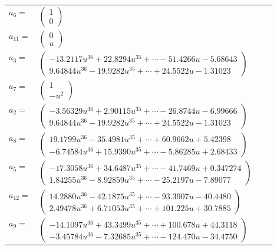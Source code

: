 \documentclass[1p]{elsarticle_modified}
\theoremstyle{definition}
\begin{document}
\begin{tabular}{m{7pt} m{180pt} m{7pt} m{180pt} }
\flushright $a_{6}=$&$\begin{pmatrix}1\\0\end{pmatrix}$ \\
\flushright $a_{11}=$&$\begin{pmatrix}0\\u\end{pmatrix}$ \\
\flushright $a_{3}=$&$\begin{pmatrix}-13.2117 u^{36}+22.8294 u^{35}+\cdots-51.4266 u-5.68643\\9.64844 u^{36}-19.9282 u^{35}+\cdots+24.5522 u-1.31023\end{pmatrix}$ \\
\flushright $a_{7}=$&$\begin{pmatrix}1\\- u^2\end{pmatrix}$ \\
\flushright $a_{2}=$&$\begin{pmatrix}-3.56329 u^{36}+2.90115 u^{35}+\cdots-26.8744 u-6.99666\\9.64844 u^{36}-19.9282 u^{35}+\cdots+24.5522 u-1.31023\end{pmatrix}$ \\
\flushright $a_{8}=$&$\begin{pmatrix}19.1799 u^{36}-35.4981 u^{35}+\cdots+60.9662 u+5.42398\\-6.74584 u^{36}+15.9390 u^{35}+\cdots-5.86285 u+2.68433\end{pmatrix}$ \\
\flushright $a_{5}=$&$\begin{pmatrix}-17.3058 u^{36}+34.6487 u^{35}+\cdots-41.7469 u+0.347274\\1.84255 u^{36}-8.92859 u^{35}+\cdots-25.2197 u-7.89077\end{pmatrix}$ \\
\flushright $a_{12}=$&$\begin{pmatrix}14.2880 u^{36}-42.1875 u^{35}+\cdots-93.3907 u-40.4480\\2.49478 u^{36}+6.71053 u^{35}+\cdots+101.225 u+30.7885\end{pmatrix}$ \\
\flushright $a_{9}=$&$\begin{pmatrix}-14.1097 u^{36}+43.3499 u^{35}+\cdots+100.678 u+44.3118\\-3.45784 u^{36}-7.32685 u^{35}+\cdots-124.470 u-34.4750\end{pmatrix}$ \\

\end{tabular}
\end{document}
